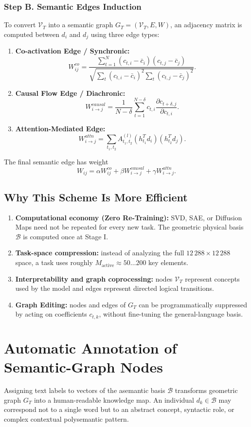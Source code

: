 \documentclass[11pt,a4paper]{article}
\begin{document}
\subsubsection*{Step B. Semantic Edges Induction}
To convert $\mathcal V_T$ into a semantic graph $G_T=(\mathcal V_T,E,W)$, an adjacency matrix is computed between $d_i$ and $d_j$ using three edge types:
\begin{enumerate}
\item \textbf{Co-activation Edge / Synchronic:}
\[W_{ij}^{co}=\frac{\sum_{t=1}^N(c_{t,i}-\bar c_i)(c_{t,j}-\bar c_j)}{\sqrt{\sum_t(c_{t,i}-\bar c_i)^2\sum_t(c_{t,j}-\bar c_j)^2}}.\]
\item \textbf{Causal Flow Edge / Diachronic:}
\[W_{i\rightarrow j}^{causal}=\frac1{N-\delta}\sum_{t=1}^{N-\delta}c_{t,i}\frac{\partial c_{t+\delta,j}}{\partial c_{t,i}}.\]
\item \textbf{Attention-Mediated Edge:}
\[W_{i\rightarrow j}^{attn}=\sum_{t_1,t_2}A_{t_1,t_2}^{(l)}(h_{t_1}^Td_i)(h_{t_2}^Td_j).\]
\end{enumerate}
The final semantic edge has weight
\[W_{ij}=\alpha W_{ij}^{co}+\beta W_{i\rightarrow j}^{causal}+\gamma W_{i\rightarrow j}^{attn}.\]

\subsection*{Why This Scheme Is More Efficient}
\begin{enumerate}
\item \textbf{Computational economy (Zero Re-Training):} SVD, SAE, or Diffusion Maps need not be repeated for every new task. The geometric physical basis $\mathcal B$ is computed once at Stage I.
\item \textbf{Task-space compression:} instead of analyzing the full $12\,288\times12\,288$ space, a task uses roughly $M_{\text{active}}\approx50\ldots200$ key elements.
\item \textbf{Interpretability and graph coprocessing:} nodes $\mathcal V_T$ represent concepts used by the model and edges represent directed logical transitions.
\item \textbf{Graph Editing:} nodes and edges of $G_T$ can be programmatically suppressed by acting on coefficients $c_{t,k}$, without fine-tuning the general-language basis.
\end{enumerate}

\section{Automatic Annotation of Semantic-Graph Nodes}
Assigning text labels to vectors of the asemantic basis $\mathcal B$ transforms geometric graph $G_T$ into a human-readable knowledge map. An individual $d_k\in\mathcal B$ may correspond not to a single word but to an abstract concept, syntactic role, or complex contextual polysemantic pattern.
\end{document}
